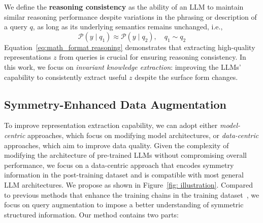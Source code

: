 We define the \textbf{reasoning consistency} as the ability of an LLM to maintain similar reasoning performance despite variations in the phrasing or description of a query $q$, as long as its underlying semantics remains unchanged, i.e.,
\begin{equation}
\label{eq: reasoning equivalence}
    \mathcal{P}(y \mid q_1) \approx \mathcal{P}(y \mid q_2), \quad q_1 \sim q_2
\end{equation}
Equation~\ref{eq:math_format reasoning} demonstrates that extracting high-quality representations $z$ from queries is crucial for ensuring reasoning consistency. In this work, we focus on \textit{invariant knowledge extraction}: improving the LLMs' capability to consistently extract useful $z$ despite the surface form changes.
\subsection{Symmetry-Enhanced Data Augmentation}
To improve representation extraction capability, we can adopt either \textit{model-centric} approaches, which focus on modifying model architectures, or \textit{data-centric} approaches, which aim to improve data quality. Given the complexity of modifying the architecture of pre-trained LLMs without compromising overall performance, we focus on a data-centric approach that encodes symmetry information in the post-training dataset and is compatible with most general LLM architectures.
We propose \methodlong as shown in Figure~\ref{fig: illustration}. Compared to previous methods that enhance the training chains in the training dataset~\citep{yu2023metamath}, we focus on query augmentation to impose a better understanding of symmetric structured information. Our method contains two parts:


